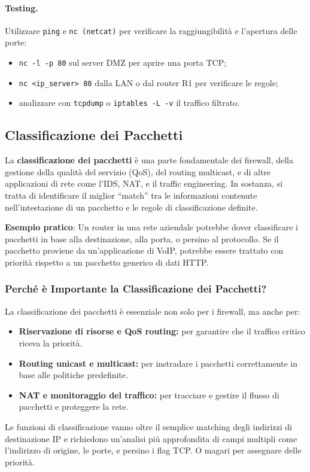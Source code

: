 \paragraph{Testing.}
Utilizzare \texttt{ping} e \texttt{nc (netcat)} per verificare la raggiungibilità e l’apertura delle porte:
\begin{itemize}
 \item \texttt{nc -l -p 80} sul server DMZ per aprire una porta TCP;
 \item \texttt{nc <ip\_server> 80} dalla LAN o dal router R1 per verificare le regole;
 \item analizzare con \texttt{tcpdump} o \texttt{iptables -L -v} il traffico filtrato.
\end{itemize}

\newpage
\maketitle


\subsection{Classificazione dei Pacchetti}
La \textbf{classificazione dei pacchetti} è una parte fondamentale dei firewall, della gestione della qualità del servizio (QoS), del routing multicast, e di altre applicazioni di rete come l'IDS, NAT, e il traffic engineering. In sostanza, si tratta di identificare il miglior “match” tra le informazioni contenute nell'intestazione di un pacchetto e le regole di classificazione definite.

\textbf{Esempio pratico}:
Un router in una rete aziendale potrebbe dover classificare i pacchetti in base alla destinazione, alla porta, o persino al protocollo. Se il pacchetto proviene da un'applicazione di VoIP, potrebbe essere trattato con priorità rispetto a un pacchetto generico di dati HTTP.

\subsubsection{Perché è Importante la Classificazione dei Pacchetti?}
La classificazione dei pacchetti è essenziale non solo per i firewall, ma anche per:
\begin{itemize}
  \item \textbf{Riservazione di risorse e QoS routing:} per garantire che il traffico critico riceva la priorità.
  \item \textbf{Routing unicast e multicast:} per instradare i pacchetti correttamente in base alle politiche predefinite.
  \item \textbf{NAT e monitoraggio del traffico:} per tracciare e gestire il flusso di pacchetti e proteggere la rete.
\end{itemize}
Le funzioni di classificazione vanno oltre il semplice matching degli indirizzi di destinazione IP e richiedono un'analisi più approfondita di campi multipli come l'indirizzo di origine, le porte, e persino i flag TCP. O magari per assegnare delle priorità.

